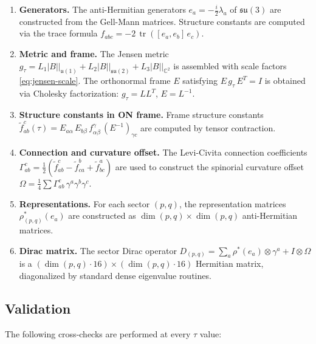 \documentclass[12pt]{article}
\theoremstyle{definition}
\theoremstyle{remark}
\DeclareMathOperator{\tr}{tr}
\begin{document}
\begin{enumerate}
\item \textbf{Generators.}  The anti-Hermitian generators
  $e_a = -\tfrac{i}{2}\lambda_a$ of $\mathfrak{su}(3)$ are constructed
  from the Gell-Mann matrices.  Structure constants are computed via
  the trace formula
  $f_{abc} = -2\,\tr([e_a, e_b]\, e_c)$.

\item \textbf{Metric and frame.}  The Jensen metric
  $g_\tau = L_1 |B|\big|_{\mathfrak{u}(1)} + L_2 |B|\big|_{\mathfrak{su}(2)} +
  L_3 |B|\big|_{\mathbb{C}^2}$ is assembled with scale factors
  \eqref{eq:jensen-scale}.  The orthonormal frame $E$ satisfying
  $E\, g_\tau\, E^T = I$ is obtained via Cholesky factorization:
  $g_\tau = LL^T$, $E = L^{-1}$.

\item {\sloppy \textbf{Structure constants in ON frame.}  Frame structure
  constants $\tilde{f}^c_{ab}(\tau) = E_{a\alpha}\, E_{b\beta}\,
  f^\gamma_{\alpha\beta}\, (E^{-1})_{\gamma c}$ are computed
  by tensor contraction.\par}

\item \textbf{Connection and curvature offset.}  The Levi-Civita
  connection coefficients
  $\Gamma^c_{ab} = \tfrac{1}{2}(\tilde{f}^c_{ab} - \tilde{f}^b_{ca} +
  \tilde{f}^a_{bc})$
  are used to construct the spinorial curvature offset
  $\Omega = \tfrac{1}{4}\sum \Gamma^c_{ab}\, \gamma^a\gamma^b\gamma^c$.

\item \textbf{Representations.}  For each sector $(p,q)$, the
  representation matrices $\rho_{(p,q)}^*(e_a)$ are constructed as
  $\dim(p,q) \times \dim(p,q)$ anti-Hermitian matrices.

\item \textbf{Dirac matrix.}  The sector Dirac operator
  $D_{(p,q)} = \sum_a \rho^*(e_a) \otimes \gamma^a + I \otimes \Omega$
  is a $(\dim(p,q) \cdot 16) \times (\dim(p,q) \cdot 16)$ Hermitian
  matrix, diagonalized by standard dense eigenvalue routines.
\end{enumerate}


\subsection{Validation}

The following cross-checks are performed at every $\tau$ value:
\end{document}
